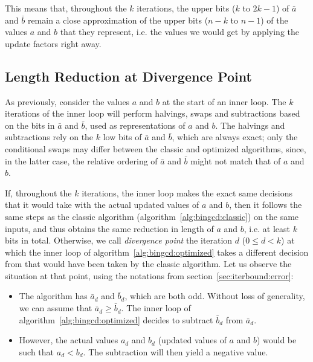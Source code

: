 \documentclass{llncs}
\begin{document}
This means that, throughout the $k$ iterations, the upper bits ($k$ to
$2k-1$) of $\bar a$ and $\bar b$ remain a close approximation of the
upper bits ($n-k$ to $n-1$) of the values $a$ and $b$ that they
represent, i.e. the values we would get by applying the update factors
right away.

\subsection{Length Reduction at Divergence Point}\label{sec:iterbound:diverge}

As previously, consider the values $a$ and $b$ at the start of an inner
loop. The $k$ iterations of the inner loop will perform halvings, swaps
and subtractions based on the bits in $\bar a$ and $\bar b$, used as
representations of $a$ and $b$. The halvings and subtractions rely on
the $k$ low bits of $\bar a$ and $\bar b$, which are always exact; only
the conditional swaps may differ between the classic and optimized
algorithms, since, in the latter case, the relative ordering of $\bar a$
and $\bar b$ might not match that of $a$ and $b$.

If, throughout the $k$ iterations, the inner loop makes the exact same
decisions that it would take with the actual updated values of $a$ and
$b$, then it follows the same steps as the classic algorithm
(algorithm~\ref{alg:bingcd:classic}) on the same inputs, and thus
obtains the same reduction in length of $a$ and $b$, i.e. at least $k$
bits in total. Otherwise, we call \emph{divergence point} the iteration
$d$ ($0\leq d < k$) at which the inner loop of
algorithm~\ref{alg:bingcd:optimized} takes a different decision from
that would have been taken by the classic algorithm. Let us observe the
situation at that point, using the notations from
section~\ref{sec:iterbound:error}:
\begin{itemize}

    \item The algorithm has $\bar a_d$ and $\bar b_d$, which are both odd.
    Without loss of generality, we can assume that $\bar a_d \geq \bar b_d$.
    The inner loop of algorithm~\ref{alg:bingcd:optimized} decides to
    subtract $\bar b_d$ from $\bar a_d$.

    \item However, the actual values $a_d$ and $b_d$ (updated values of
    $a$ and $b$) would be such that $a_d < b_d$. The subtraction will
    then yield a negative value.

\end{itemize}
\end{document}
